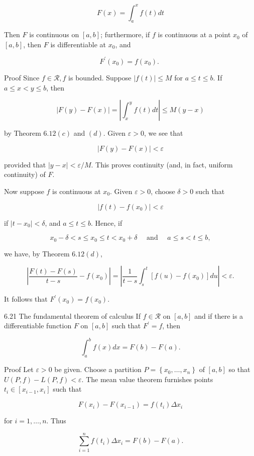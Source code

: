 \documentclass[10pt]{article}
\begin{document}
$$
F(x)=\int_{a}^{x} f(t) d t
$$

Then $F$ is continuous on $[a, b]$; furthermore, if $f$ is continuous at a point $x_{0}$ of $[a, b]$, then $F$ is differentiable at $x_{0}$, and

$$
F^{\prime}\left(x_{0}\right)=f\left(x_{0}\right) \text {. }
$$

Proof Since $f \in \mathscr{R}, f$ is bounded. Suppose $|f(t)| \leq M$ for $a \leq t \leq b$. If $a \leq x<y \leq b$, then

$$
|F(y)-F(x)|=\left|\int_{x}^{y} f(t) d t\right| \leq M(y-x)
$$

by Theorem $6.12(c)$ and $(d)$. Given $\varepsilon>0$, we see that

$$
|F(y)-F(x)|<\varepsilon
$$

provided that $|y-x|<\varepsilon / M$. This proves continuity (and, in fact, uniform continuity) of $F$.

Now suppose $f$ is continuous at $x_{0}$. Given $\varepsilon>0$, choose $\delta>0$ such that

$$
\left|f(t)-f\left(x_{0}\right)\right|<\varepsilon
$$

if $\left|t-x_{0}\right|<\delta$, and $a \leq t \leq b$. Hence, if

$$
x_{0}-\delta<s \leq x_{0} \leq t<x_{0}+\delta \quad \text { and } \quad a \leq s<t \leq b,
$$

we have, by Theorem $6.12(d)$,

$$
\left|\frac{F(t)-F(s)}{t-s}-f\left(x_{0}\right)\right|=\left|\frac{1}{t-s} \int_{s}^{t}\left[f(u)-f\left(x_{0}\right)\right] d u\right|<\varepsilon .
$$

It follows that $F^{\prime}\left(x_{0}\right)=f\left(x_{0}\right)$.

6.21 The fundamental theorem of calculus If $f \in \mathscr{R}$ on $[a, b]$ and if there is a differentiable function $F$ on $[a, b]$ such that $F^{\prime}=f$, then

$$
\int_{a}^{b} f(x) d x=F(b)-F(a) .
$$

Proof Let $\varepsilon>0$ be given. Choose a partition $P=\left\{x_{0}, \ldots, x_{n}\right\}$ of $[a, b]$ so that $U(P, f)-L(P, f)<\varepsilon$. The mean value theorem furnishes points $t_{i} \in\left[x_{i-1}, x_{i}\right]$ such that

$$
F\left(x_{i}\right)-F\left(x_{i-1}\right)=f\left(t_{i}\right) \Delta x_{i}
$$

for $i=1, \ldots, n$. Thus

$$
\sum_{i=1}^{n} f\left(t_{i}\right) \Delta x_{i}=F(b)-F(a) .
$$
\end{document}
